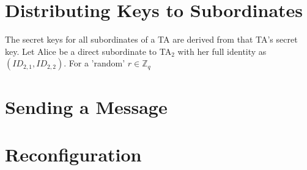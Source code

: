 \documentclass[10pt]{article}
\begin{document}
\section*{Distributing Keys to Subordinates}
The secret keys for all subordinates of a TA are derived from that TA's secret key.  Let Alice be a direct subordinate to TA$_2$ with her full identity as $(ID_{2,1}, ID_{2,2})$.  For a 'random' $r \in \mathbb{Z}_q$ 

\section*{Sending a Message}

\section*{Reconfiguration}
\end{document}
